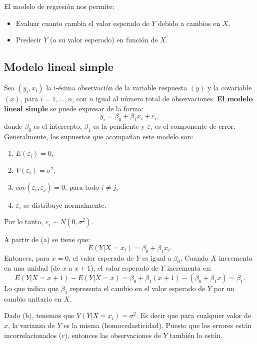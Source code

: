 \documentclass[
]{article}
\providecommand{\tightlist}{%
  \setlength{\itemsep}{0pt}\setlength{\parskip}{0pt}}
\begin{document}
El modelo de regresión nos permite:

\begin{itemize}
\tightlist
\item
  Evaluar cuanto cambia el valor esperado de \(Y\) debido a cambios en \(X\),
\item
  Predecir \(Y\) (o su valor esperado) en función de \(X\).
\end{itemize}

\hypertarget{modelo-lineal-simple-1}{%
\subsection{Modelo lineal simple}\label{modelo-lineal-simple-1}}

Sea \((y_{i},x_{i})\) la i-ésima observación de la variable respuesta \((y)\) y la covariable \((x)\), para \(i=1,\ldots,n\), con \(n\) igual al número total de observaciones. \textbf{El modelo lineal simple} se puede expresar de la forma:
\[
y_{i} = \beta_{0} + \beta_{1}x_{i}+\varepsilon_{i},
\]
donde \(\beta_{0}\) es el intercepto, \(\beta_{1}\) es la pendiente y \(\varepsilon_{i}\) es el componente de error. Generalmente, los supuestos que acompañan este modelo son:

\begin{enumerate}
\def\labelenumi{\alph{enumi}.}
\tightlist
\item
  \(E(\varepsilon_{i}) = 0\),
\item
  \(V(\varepsilon_{i}) = \sigma^{2}\),
\item
  \(cov(\varepsilon_{i},\varepsilon_{j}) = 0\), para todo \(i \neq j\),
\item
  \(\varepsilon_{i}\) se distribuye normalmente.
\end{enumerate}

Por lo tanto, \(\varepsilon_{i} \sim N(0,\sigma^{2})\).

A partir de (a) se tiene que:
\[
E(Y|X=x_i) = \beta_{0} + \beta_{1}x_i.
\]
Entonces, para \(x=0\), el valor esperado de \(Y\) es igual a \(\beta_0\). Cuando \(X\) incrementa en una unidad (de \(x\) a \(x+1\)), el valor esperado de \(Y\) incrementa en:
\[
E(Y|X=x+1) - E(Y|X=x) = \beta_{0} + \beta_{1}(x+1) - (\beta_{0} + \beta_{1}x) = \beta_{1}.
\]
Lo que indica que \(\beta_{1}\) representa el cambio en el valor esperado de \(Y\) por un cambio unitario en \(X\).

Dado (b), tenemos que \(V(Y|X=x_{i}) = \sigma^{2}\). Es decir que para cualquier valor de \(x\), la varianza de \(Y\) es la misma (homocedasticidad). Puesto que los errores están incorrelacionados (c), entonces las observaciones de \(Y\) también lo están.
\end{document}
